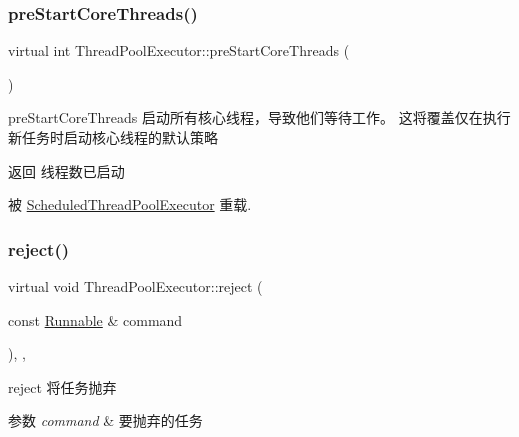 \subsubsection{\texorpdfstring{pre\+Start\+Core\+Threads()}{preStartCoreThreads()}}
{\footnotesize\ttfamily virtual int Thread\+Pool\+Executor\+::pre\+Start\+Core\+Threads (\begin{DoxyParamCaption}{ }\end{DoxyParamCaption})\hspace{0.3cm}{\ttfamily [virtual]}}



pre\+Start\+Core\+Threads 启动所有核心线程，导致他们等待工作。 这将覆盖仅在执行新任务时启动核心线程的默认策略 

\begin{DoxyReturn}{返回}
线程数已启动 
\end{DoxyReturn}


被 \hyperlink{classScheduledThreadPoolExecutor_aed48379bdc243fd07e593205ca28f48d}{Scheduled\+Thread\+Pool\+Executor} 重载.

\mbox{\label{classThreadPoolExecutor_a14c4e3d786dcf22e858b11a95d2f77ef}} 
\subsubsection{\texorpdfstring{reject()}{reject()}\hspace{0.1cm}{\footnotesize\ttfamily [1/2]}}
{\footnotesize\ttfamily virtual void Thread\+Pool\+Executor\+::reject (\begin{DoxyParamCaption}\item[{const \hyperlink{classRunnable}{Runnable} \&}]{command }\end{DoxyParamCaption})\hspace{0.3cm}{\ttfamily [inline]}, {\ttfamily [final]}, {\ttfamily [virtual]}}



reject 将任务抛弃 


\begin{DoxyParams}{参数}
{\em command} & 要抛弃的任务 \\
\hline
\end{DoxyParams}
\mbox{\label{classThreadPoolExecutor_a353e65b77bb3c0950ed79939473d4852}} 
